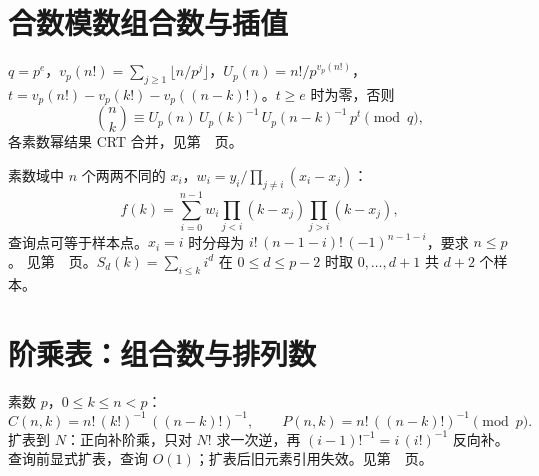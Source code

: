 \section{合数模数组合数与插值}\label{knowledge-exlucas}
$q=p^e$，$v_p(n!)=\sum_{j\ge1}\lfloor n/p^j\rfloor$，$U_p(n)=n!/p^{v_p(n!)}$，
$t=v_p(n!)-v_p(k!)-v_p((n-k)!)$。$t\ge e$ 时为零，否则
\[
\binom nk\equiv U_p(n)\,U_p(k)^{-1}\,U_p(n-k)^{-1}\,p^t\pmod q,
\]
各素数幂结果 CRT 合并，见第~\pageref{compact-ExLucas}~页。

素数域中 $n$ 个两两不同的 $x_i$，$w_i=y_i/\prod_{j\ne i}(x_i-x_j)$：
\[
f(k)=\sum_{i=0}^{n-1}w_i\prod_{j<i}(k-x_j)\prod_{j>i}(k-x_j),
\]
查询点可等于样本点。$x_i=i$ 时分母为 $i!\,(n-1-i)!\,(-1)^{n-1-i}$，要求 $n\le p$。
见第~\pageref{compact-Lagrange}~页。$S_d(k)=\sum_{i\le k}i^d$ 在 $0\le d\le p-2$ 时取 $0,\ldots,d+1$ 共 $d+2$ 个样本。

\section{阶乘表：组合数与排列数}\label{knowledge-factorial-table}
素数 $p$，$0\le k\le n<p$：
\[
C(n,k)=n!\,(k!)^{-1}\,((n-k)!)^{-1},\qquad
P(n,k)=n!\,((n-k)!)^{-1}\pmod p.
\]
扩表到 $N$：正向补阶乘，只对 $N!$ 求一次逆，再 $(i-1)!^{-1}=i\,(i!)^{-1}$ 反向补。
查询前显式扩表，查询 $O(1)$；扩表后旧元素引用失效。见第~\pageref{compact-Binomial}~页。
